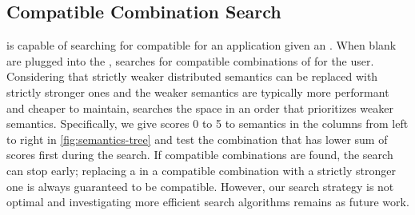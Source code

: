 \subsection{Compatible Combination Search}

\sysname{} is capable of searching for compatible \sysmods{} for an
application given an \sysgraph{}. When blank \sysmods{} are plugged into the
\sysgraph{}, \sysname{} searches for compatible combinations of
\sysmods{} for the user.
Considering that strictly weaker distributed semantics can be replaced
with strictly stronger ones and the weaker semantics are typically
more performant and cheaper to maintain, \sysname{} searches the space
in an order that prioritizes weaker semantics. Specifically, we give scores
0 to 5 to semantics in the columns from left to right in
\cref{fig:semantics-tree}
and test the combination that has lower sum of scores first during the search.
If compatible combinations are found, the search can stop early; replacing a
\sysmod{} in a compatible combination with a strictly stronger one is always
guaranteed to be compatible.
However, our search strategy is not optimal and investigating more
efficient search algorithms remains as future work.

